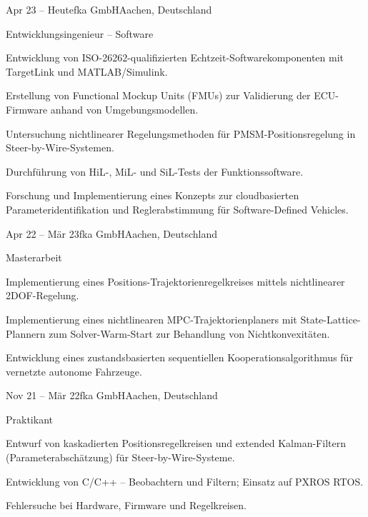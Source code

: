\documentclass[11pt,a4paper,lang=de]{mycv}
\begin{document}
	\makecvheader
	\begin{profexperience}
		\begin{experienceentry}{Apr 23 -- Heute}{fka GmbH}{Aachen, Deutschland}
			\begin{role}{Entwicklungsingenieur -- Software}{}
				\item Entwicklung von ISO-26262-qualifizierten Echtzeit-Softwarekomponenten mit TargetLink und MATLAB/Simulink.
				\item Erstellung von Functional Mockup Units (FMUs) zur Validierung der ECU-Firmware anhand von Umgebungsmodellen.
				\item Untersuchung nichtlinearer Regelungsmethoden für PMSM-Positionsregelung in Steer-by-Wire-Systemen.
				\item Durchführung von HiL-, MiL- und SiL-Tests der Funktionssoftware.
				\item Forschung und Implementierung eines Konzepts zur cloudbasierten Parameteridentifikation und Reglerabstimmung für Software-Defined Vehicles.
			\end{role}
		\end{experienceentry}
		\begin{experienceentry}{Apr 22 -- Mär 23}{fka GmbH}{Aachen, Deutschland}
			\begin{role}{Masterarbeit}{}
				\item Implementierung eines Positions-Trajektorienregelkreises mittels nichtlinearer 2DOF-Regelung.
				\item Implementierung eines nichtlinearen MPC-Trajektorienplaners mit State-Lattice-Plannern zum Solver-Warm-Start zur Behandlung von Nichtkonvexitäten.
				\item Entwicklung eines zustandsbasierten sequentiellen Kooperationsalgorithmus für vernetzte autonome Fahrzeuge.
			\end{role}
		\end{experienceentry}
		\begin{experienceentry}{Nov 21 -- Mär 22}{fka GmbH}{Aachen, Deutschland}
			\begin{role}{Praktikant}{}
				\item Entwurf von kaskadierten Positionsregelkreisen und extended Kalman-Filtern (Parameterabschätzung) für Steer-by-Wire-Systeme.
				\item Entwicklung von C/C++ -- Beobachtern und Filtern; Einsatz auf PXROS RTOS.
				\item Fehlersuche bei Hardware, Firmware und Regelkreisen.

\end{role}
\end{experienceentry}
\end{profexperience}
\end{document}
